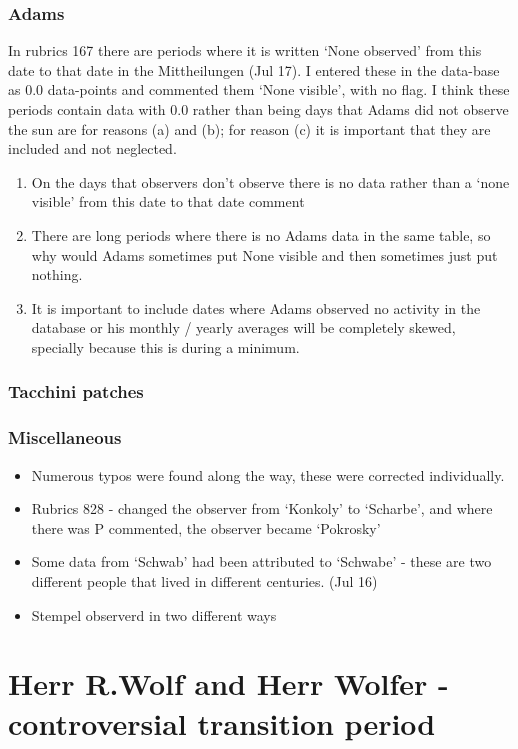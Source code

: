 \documentclass[12pt]{article}
\begin{document}
\subsubsection{Adams}
In rubrics 167 there are periods where it is written `None observed' from this date to that date in the Mittheilungen (Jul 17). I entered these in the data-base as 0.0 data-points and commented them `None visible', with no flag. I think these periods contain data with 0.0 rather than being days that Adams did not observe the sun are for reasons (a) and (b); for reason (c) it is important that they are included and not neglected.
\begin{enumerate}[(\alph*)]
    \item On the days that observers don't observe there is no data rather than a `none visible' from this date to that date comment
    \item There are long periods where there is no Adams data in the same table, so why would Adams sometimes put None visible and then sometimes just put nothing.
    \item It is important to include dates where Adams observed no activity in the database or his monthly / yearly averages will be completely skewed, specially because this is during a minimum.
\end{enumerate}

\subsubsection{Tacchini patches}

\subsubsection{Miscellaneous}
\begin{itemize}
    \item Numerous typos were found along the way, these were corrected individually.
    \item Rubrics 828 - changed the observer from `Konkoly' to `Scharbe', and where there was P commented, the observer became `Pokrosky'
    
    \item Some data from `Schwab' had been attributed to `Schwabe' - these are two different people that lived in different centuries. (Jul 16)
    \item Stempel observerd in two different ways
\end{itemize}


\section{Herr R.Wolf and Herr Wolfer - controversial transition period}
\end{document}
